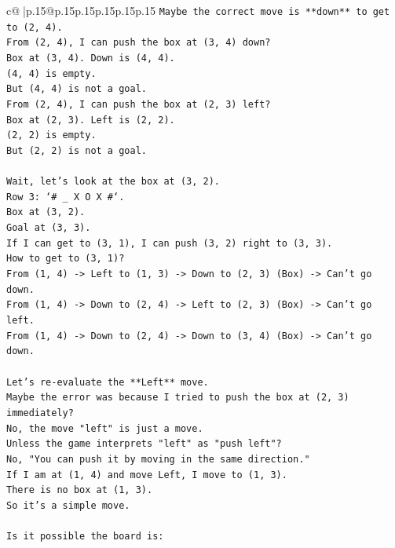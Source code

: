 \documentclass{article}
\begin{document}
{\begin{supertabular}{c@{$\;$}|p{.15\linewidth}@{}p{.15\linewidth}p{.15\linewidth}p{.15\linewidth}p{.15\linewidth}p{.15\linewidth}}
{{{\texttt{Maybe the correct move is **down** to get to (2, 4).} \\
\texttt{From (2, 4), I can push the box at (3, 4) down?} \\
\texttt{Box at (3, 4). Down is (4, 4).} \\
\texttt{(4, 4) is empty.} \\
\texttt{But (4, 4) is not a goal.} \\
\texttt{From (2, 4), I can push the box at (2, 3) left?} \\
\texttt{Box at (2, 3). Left is (2, 2).} \\
\texttt{(2, 2) is empty.} \\
\texttt{But (2, 2) is not a goal.} \\
\\ 
\texttt{Wait, let's look at the box at (3, 2).} \\
\texttt{Row 3: `\# \_ X O X \#`.} \\
\texttt{Box at (3, 2).} \\
\texttt{Goal at (3, 3).} \\
\texttt{If I can get to (3, 1), I can push (3, 2) right to (3, 3).} \\
\texttt{How to get to (3, 1)?} \\
\texttt{From (1, 4) {-}> Left to (1, 3) {-}> Down to (2, 3) (Box) {-}> Can't go down.} \\
\texttt{From (1, 4) {-}> Down to (2, 4) {-}> Left to (2, 3) (Box) {-}> Can't go left.} \\
\texttt{From (1, 4) {-}> Down to (2, 4) {-}> Down to (3, 4) (Box) {-}> Can't go down.} \\
\\ 
\texttt{Let's re{-}evaluate the **Left** move.} \\
\texttt{Maybe the error was because I tried to push the box at (2, 3) immediately?} \\
\texttt{No, the move "left" is just a move.} \\
\texttt{Unless the game interprets "left" as "push left"?} \\
\texttt{No, "You can push it by moving in the same direction."} \\
\texttt{If I am at (1, 4) and move Left, I move to (1, 3).} \\
\texttt{There is no box at (1, 3).} \\
\texttt{So it's a simple move.} \\
\\ 
\texttt{Is it possible the board is:} \\
}}}
\end{supertabular}}
\end{document}
